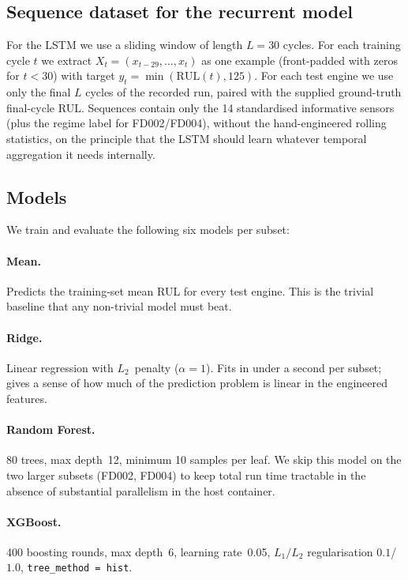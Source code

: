 \documentclass[11pt,letterpaper]{article}
\begin{document}
\subsection{Sequence dataset for the recurrent model}
For the LSTM we use a sliding window of length $L = 30$ cycles. For
each training cycle $t$ we extract
$X_t = (x_{t-29}, \ldots, x_t)$ as one example (front-padded with zeros
for $t < 30$) with target
$y_t = \min(\mathrm{RUL}(t), 125)$. For each test engine we use only
the final $L$ cycles of the recorded run, paired with the supplied
ground-truth final-cycle RUL. Sequences contain only the 14
standardised informative sensors (plus the regime label for
FD002/FD004), without the hand-engineered rolling statistics, on the
principle that the LSTM should learn whatever temporal aggregation it
needs internally.

\subsection{Models}\label{sec:models}
We train and evaluate the following six models per subset:

\paragraph{Mean.} Predicts the training-set mean RUL for every test
engine. This is the trivial baseline that any non-trivial model must
beat.

\paragraph{Ridge.} Linear regression with $L_2$~penalty ($\alpha = 1$).
Fits in under a second per subset; gives a sense of how much of the
prediction problem is linear in the engineered features.

\paragraph{Random Forest.} 80 trees, max depth~12, minimum 10 samples
per leaf. We skip this model on the two larger subsets (FD002, FD004)
to keep total run time tractable in the absence of substantial
parallelism in the host container.

\paragraph{XGBoost.} 400 boosting rounds, max depth~6, learning
rate~0.05, $L_1/L_2$ regularisation $0.1$/$1.0$,
\texttt{tree\_method = hist}.
\end{document}
